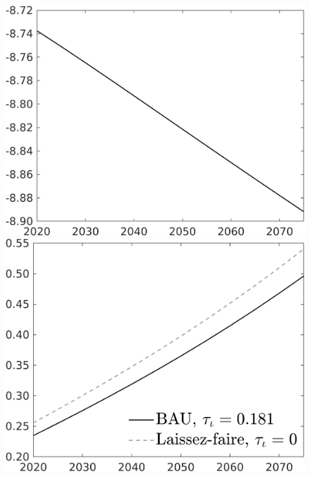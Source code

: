 \documentclass[12pt]{article}
\begin{document}
\begin{figure}[h!!]
\begin{minipage}[]{0.32\textwidth}
\end{minipage}	
\begin{minipage}[]{0.32\textwidth}
	\includegraphics[width=1\textwidth]{../../codding_model/own_basedOnFried/optimalPol_010922_revision/figures/all_13Sept22/CompTaul_Equlab_LFBAUPer_Reg0_G_spillover0_nsk0_xgr0_knspil1_sep1_countec0_GovRev0_etaa0.79.png}
\end{minipage}	
	\begin{minipage}[]{0.32\textwidth}
		\includegraphics[width=1\textwidth]{../../codding_model/own_basedOnFried/optimalPol_010922_revision/figures/all_13Sept22/CompTaul_Equlab_LFBAU_Reg0_F_spillover0_nsk0_xgr0_knspil1_sep1_countec0_GovRev0_etaa0.79_lgd1.png}

\end{minipage}
\end{figure}
\end{document}
